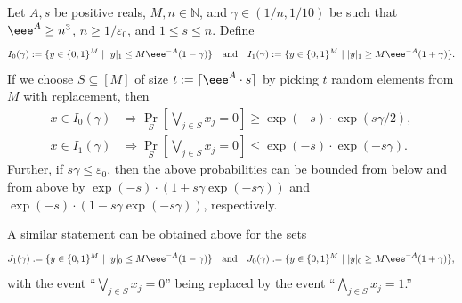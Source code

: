 \documentclass{toc}
\begin{document}
\begin{lemma}
\label{lem:technicalORAND}
Let $A,s$ be positive reals, $M,n\in\mathbb{N}$,  and $\gamma\in ({1}/{n},{1}/{10})$ be such that $\eee^A \geq n^3$, $n \geq {1}/{\varepsilon_0}$, and $1\leq s\leq n$. Define
\[
  I_0(\gamma) := \{y\in \{0,1\}^M\ |\ |y|_1\leq M\eee^{-A}(1-\gamma)\}\quad\text{and}\quad I_1(\gamma) := \{y\in \{0,1\}^M\ |\ |y|_1\geq M\eee^{-A}(1+\gamma)\}.
\]
If we choose $S\subseteq [M]$ of size
$t := \lceil \eee^{A}\cdot s\rceil$ by picking $t$ random elements
from $M$ with replacement, then
\begin{align*}
x\in I_0(\gamma) &\Rightarrow \Pr_{S}\left[\bigvee_{j\in S}x_j = 0\right] \geq \exp(-s)\cdot\exp(s\gamma/2), \\
x\in I_1(\gamma) &\Rightarrow \Pr_{S}\left[\bigvee_{j\in S}x_j = 0\right] \leq \exp(-s)\cdot \exp(-s\gamma).
\end{align*}
Further, if $s\gamma \leq \varepsilon_0$, then the above probabilities can be 
%
bounded from below and from above  %
by $\exp(-s)\cdot (1+s\gamma\exp(-s\gamma))$ and
$\exp(-s)\cdot (1-s\gamma\exp(-s\gamma))$, %
respectively.  %

A similar statement can be obtained above for the sets
\[
  J_1(\gamma) := \{y\in \{0,1\}^M\ |\ |y|_0\leq M\eee^{-A}(1-\gamma)\}\quad\text{and}\quad J_0(\gamma) := \{y\in \{0,1\}^M\ |\ |y|_0\geq M\eee^{-A}(1+\gamma)\},
\]
with the event ``$\bigvee_{j\in S}x_j = 0$'' being replaced by the
event ``$\bigwedge_{j\in S}x_j = 1$.''
\end{lemma}
\end{document}
